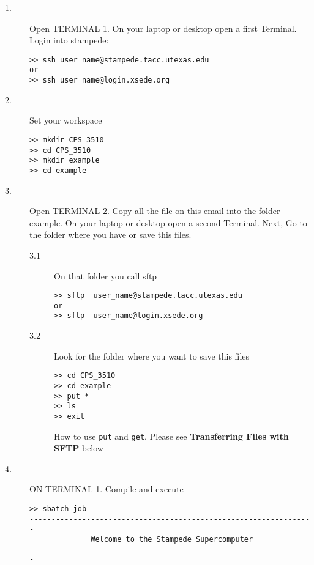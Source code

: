 \documentclass{article}
\begin{document}
\begin{description}
\item [1.] Open TERMINAL 1. On your laptop or desktop open a first Terminal. Login into stampede:
\begin{scriptsize}\begin{verbatim}
>> ssh user_name@stampede.tacc.utexas.edu
or
>> ssh user_name@login.xsede.org
\end{verbatim}\end{scriptsize}
\item [2.] Set your workspace
\begin{scriptsize}\begin{verbatim}
>> mkdir CPS_3510
>> cd CPS_3510
>> mkdir example
>> cd example
\end{verbatim}\end{scriptsize}
\item [3.] Open TERMINAL 2.  Copy all the file on this email into the folder example.
On your laptop or desktop open a second Terminal. Next, Go to the folder where you have or save this files. 
\begin{description}
 \item [3.1] On that folder you call sftp
\begin{scriptsize}\begin{verbatim}
>> sftp  user_name@stampede.tacc.utexas.edu
or
>> sftp  user_name@login.xsede.org
\end{verbatim}\end{scriptsize}
\item [3.2] Look for the folder where you want to save this files
\begin{scriptsize}\begin{verbatim}
>> cd CPS_3510
>> cd example
>> put *
>> ls
>> exit
\end{verbatim}\end{scriptsize}
How to use \verb+put+ and \verb+get+. Please see \textbf{Transferring Files with SFTP} below
\end{description}
\item [4.] ON TERMINAL 1.  Compile and execute
\begin{scriptsize}\begin{verbatim}
>> sbatch job
-----------------------------------------------------------------
              Welcome to the Stampede Supercomputer              
-----------------------------------------------------------------


\end{verbatim}
\end{scriptsize}
\end{description}
\end{document}
